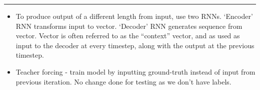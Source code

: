 \documentclass[12pt]{article}
\newcommand{\divider}[0]{\par\textcolor{lightgray}{\rule{\textwidth}{0.1pt}}}
\begin{document}
\divider 

\begin{itemize}
	\item To produce output of a different length from input, use two RNNs. `Encoder' RNN transforms input to vector. `Decoder' RNN generates sequence from vector. Vector is often referred to as the ``context'' vector, and as used as input to the decoder at every timestep, along with the output at the previous timestep.
	\item Teacher forcing - train model by inputting ground-truth instead of input from previous iteration. No change done for testing as we don't have labels.
\end{itemize}
\end{document}
